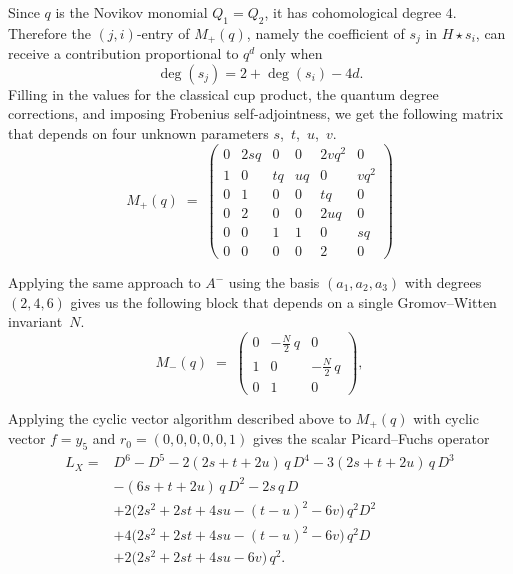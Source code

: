 \documentclass{amsart}
\theoremstyle{definition}
\theoremstyle{remark}
\begin{document}
\label{ssec:ansatz-sym}
Since \(q\) is the Novikov monomial \(Q_1=Q_2\), it has
cohomological degree \(4\). Therefore the \((j,i)\)-entry of \(M_+(q)\), namely
the coefficient of \(s_j\) in \(H\star s_i\), can receive a contribution
proportional to \(q^d\) only when
\[
\deg(s_j)=2+\deg(s_i)-4d.
\]
Filling in the values for the classical cup product, the quantum degree corrections, and imposing Frobenius self-adjointness, we get the following matrix that depends on four unknown parameters $s$,~$t$,~$u$,~$v$. 
\begin{equation}\label{eq:M-plus}
  M_+(q)
  \;=\;
  \begin{pmatrix}
    0  & 2s q & 0        & 0       & 2vq^2   & 0       \\
    1  & 0         & t q  & u q  & 0        & vq^2    \\
    0  & 1         & 0        & 0       & t q  & 0       \\
    0  & 2         & 0        & 0       & 2u q  & 0       \\
    0  & 0         & 1        & 1       & 0        & s q \\
    0  & 0         & 0        & 0       & 2        & 0
  \end{pmatrix}
\end{equation}



\label{ssec:ansatz-anti}
Applying the same approach to $A^-$ using the basis $(a_1,a_2,a_3)$ with
degrees $(2,4,6)$ gives us the following block that depends on a single Gromov--Witten invariant~$N$.
\begin{equation}\label{eq:M-minus}
  M_-(q)
  \;=\;
  \begin{pmatrix}
    0                 & -\tfrac{N}{2}\,q & 0                 \\
    1                 & 0                 & -\tfrac{N}{2}\,q  \\
    0                 & 1                 & 0
  \end{pmatrix},
\end{equation}

Applying the cyclic vector algorithm described above
to $M_+(q)$ with cyclic vector $f = y_5$ and 
$r_0 = (0, 0, 0, 0, 0, 1)$ gives the scalar Picard--Fuchs operator
\begin{align*}
L_X ={}& D^6 - D^5 - 2(2s+t+2u)\,q\,D^4 - 3(2s+t+2u)\,q\,D^3 \\
      &- (6s+t+2u)\,q\,D^2 - 2s\,q\,D \\
      &+ 2\bigl(2s^2+2st+4su-(t-u)^2-6v\bigr)\,q^2 D^2 \\
      &+ 4\bigl(2s^2+2st+4su-(t-u)^2-6v\bigr)\,q^2 D \\
      &+ 2\bigl(2s^2+2st+4su-6v\bigr)\,q^2.
\end{align*}
\end{document}
